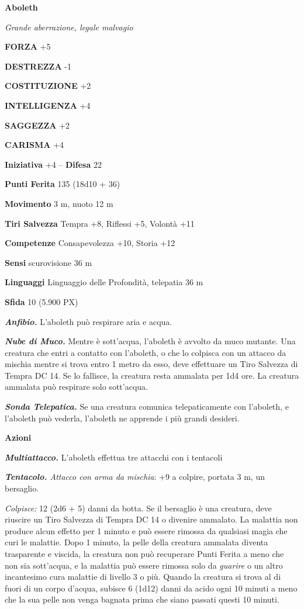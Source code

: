 \begin{multicols}{2}

	\medskip{}\textbf{Aboleth}

	\textit{Grande aberrazione, legale malvagio}

	\textbf{FORZA} +5

	\textbf{DESTREZZA} -1

	\textbf{COSTITUZIONE} +2

	\textbf{INTELLIGENZA} +4

	\textbf{SAGGEZZA} +2

	\textbf{CARISMA} +4

	\textbf{Iniziativa} +4 -- \textbf{Difesa} 22

	\textbf{Punti Ferita} 135 (18d10 + 36)

	\textbf{Movimento} 3 m, nuoto 12 m

	\textbf{Tiri Salvezza} Tempra +8, Riflessi +5, Volontà +11

	\textbf{Competenze} Consapevolezza +10, Storia +12

	\textbf{Sensi} scurovisione 36 m

	\textbf{Linguaggi} Linguaggio delle Profondità, telepatia 36 m

	\textbf{Sfida} 10 (5.900 PX)

	\textit{\textbf{Anfibio.}} L'aboleth può respirare aria e acqua.

	\textit{\textbf{Nube di Muco.}} Mentre è sott'acqua, l'aboleth è avvolto da muco mutante. Una creatura che entri a contatto con l'aboleth, o che lo colpisca con un attacco da mischia mentre si trova entro 1 metro da esso, deve effettuare un Tiro Salvezza di Tempra DC 14. Se lo fallisce, la creatura resta ammalata per 1d4 ore. La creatura ammalata può respirare solo sott'acqua.

	\textit{\textbf{Sonda Telepatica.}} Se una creatura comunica telepaticamente con l'aboleth, e l'aboleth può vederla, l'aboleth ne apprende i più grandi desideri.

	\textbf{Azioni}

	\textit{\textbf{Multiattacco.}} L'aboleth effettua tre attacchi con i tentacoli

	\textit{\textbf{Tentacolo.} Attacco con arma da mischia}: +9 a colpire, portata 3 m, un bersaglio.

	\textit{Colpisce:} 12 (2d6 + 5) danni da botta. Se il bersaglio è una creatura, deve riuscire un Tiro Salvezza di Tempra DC 14 o divenire ammalato. La malattia non produce alcun effetto per 1 minuto e può essere rimossa da qualsiasi magia che curi le malattie. Dopo 1 minuto, la pelle della creatura ammalata diventa trasparente e viscida, la creatura non può recuperare Punti Ferita a meno che non sia sott'acqua, e la malattia può essere rimossa solo da \textit{guarire} o un altro incantesimo cura malattie di livello 3 o più. Quando la creatura si trova al di fuori di un corpo d'acqua, subisce 6 (1d12) danni da acido ogni 10 minuti a meno che la sua pelle non venga bagnata prima che siano passati questi 10 minuti.


\end{multicols}
